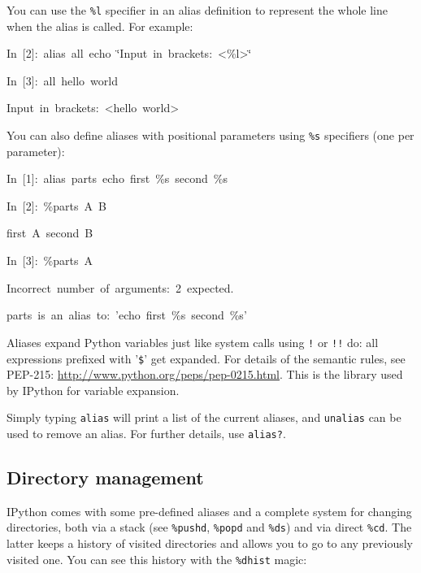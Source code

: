 You can use the \texttt{\%l} specifier in an alias definition to represent
the whole line when the alias is called. For example:

\begin{lyxcode}
In~{[}2]:~alias~all~echo~\char`\"{}Input~in~brackets:~<\%l>\char`\"{}

In~{[}3]:~all~hello~world

Input~in~brackets:~<hello~world>
\end{lyxcode}
You can also define aliases with positional parameters using \texttt{\%s}
specifiers (one per parameter):

\begin{lyxcode}
In~{[}1]:~alias~parts~echo~first~\%s~second~\%s

In~{[}2]:~\%parts~A~B

first~A~second~B

In~{[}3]:~\%parts~A

Incorrect~number~of~arguments:~2~expected.

parts~is~an~alias~to:~'echo~first~\%s~second~\%s'
\end{lyxcode}
Aliases expand Python variables just like system calls using \texttt{!}
or \texttt{!!} do: all expressions prefixed with '\texttt{\$}' get
expanded. For details of the semantic rules, see PEP-215: \url{http://www.python.org/peps/pep-0215.html}.
This is the library used by IPython for variable expansion.

Simply typing \texttt{alias} will print a list of the current aliases,
and \texttt{unalias} can be used to remove an alias. For further details,
use \texttt{alias?}.


\subsection{Directory management}

IPython comes with some pre-defined aliases and a complete system
for changing directories, both via a stack (see \texttt{\%pushd},
\texttt{\%popd} and \texttt{\%ds}) and via direct \texttt{\%cd}. The
latter keeps a history of visited directories and allows you to go
to any previously visited one. You can see this history with the \texttt{\%dhist}
magic:

